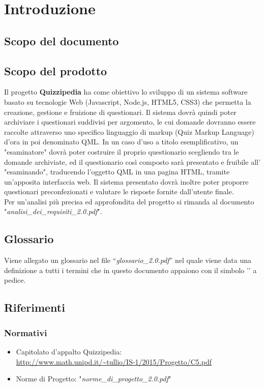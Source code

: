 \documentclass[a4paper,11pt]{article}
\begin{document}
	
	\newpage
	\section{Introduzione}
	\subsection{Scopo del documento}
	
	
	\subsection{Scopo del prodotto}
	Il progetto \textbf{Quizzipedia} ha come obiettivo lo sviluppo di un sistema software basato su tecnologie Web (Javascript\addglos, Node.js\addglos, HTML5\addglos, CSS3\addglos) che permetta la creazione, gestione e fruizione di questionari. Il sistema dovrà quindi poter archiviare i questionari suddivisi per argomento, le cui domande dovranno essere raccolte attraverso uno specifico linguaggio di markup (Quiz Markup Language) d'ora in poi denominato QML\addglos. In un caso d'uso a titolo esemplificativo, un "esaminatore" dovrà poter costruire il proprio questionario scegliendo tra le domande archiviate, ed il questionario così composto sarà presentato e fruibile all' "esaminando", traducendo l'oggetto QML in una pagina HTML\addglos, tramite un'apposita interfaccia web. Il sistema presentato dovrà inoltre poter proporre questionari preconfezionati e valutare le risposte fornite dall'utente finale.
	\\
	Per un'analisi più precisa ed approfondita del progetto si rimanda al documento\\ "\textit{analisi\_dei\_requisiti\_2.0.pdf}".
	\subsection{Glossario}
	Viene allegato un glossario nel file ``\textit{glossario\_2.0.pdf}'' nel quale viene data una definizione a tutti i termini che in questo documento appaiono con il simbolo '\addglos' a pedice.
	\subsection{Riferimenti}
		\subsubsection{Normativi}

		\begin{itemize}
			\item Capitolato d'appalto Quizzipedia:\\
			\url{http://www.math.unipd.it/~tullio/IS-1/2015/Progetto/C5.pdf}
			\item Norme di Progetto: "\textit{norme\_di\_progetto\_2.0.pdf}"
		\end{itemize}
\end{document}
